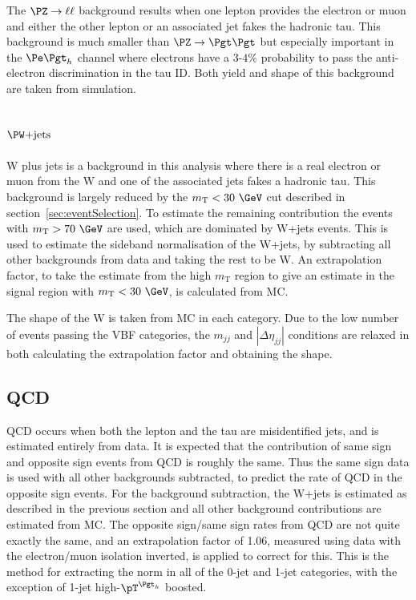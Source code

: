 The $\PZ\to\ell\ell$ background results when one lepton provides the electron or
muon and either the other lepton or an associated jet fakes the hadronic tau. This
background is much smaller than $\ZToTauTau$ but especially important in the
$\etau$ channel where electrons have a $3$-$4\%$ probability to pass the
anti-electron discrimination in the tau ID. Both yield and shape of this
background are taken from simulation.

\subsection{$\WJets$}
\label{sec:backgroundEstimation_WplusJets}

W plus jets is a background in this analysis where there is a real electron or
muon from the W and one of the associated jets fakes a hadronic tau. This
background is largely reduced by the $m_{\text{T}}< 30~\GeV$ cut described in
section~\ref{sec:eventSelection}. To estimate the remaining contribution the
events with $m_{\text{T}}> 70~\GeV$ are used, which are dominated by W+jets 
events. This is used to estimate the sideband normalisation of the W+jets, by
subtracting all other backgrounds from data and taking the rest to be W.
An extrapolation factor, to take the estimate from the high $m_{\text{T}}$ region to
give an estimate in the signal region with $m_{\text{T}}< 30~\GeV$, is calculated from MC.

The shape of the W is taken from MC in each category. Due to the low number of
events passing the VBF categories, the $m_{jj}$ and $|\Delta\eta_{jj}|$
conditions are relaxed in both calculating the extrapolation factor and
obtaining the shape.

\subsection{QCD}
\label{sec:backgroundEstimation_QCD}

QCD occurs when both the lepton and the tau are misidentified jets, and is estimated 
entirely from data. It is expected that the contribution of
same sign and opposite sign events from QCD is roughly the same. Thus the same
sign data is used with all other backgrounds subtracted, to predict the rate of
QCD in the opposite sign events. For the background subtraction, the W+jets is
estimated as described in the previous section and all other background
contributions are estimated from MC. The opposite sign/same sign rates from QCD
are not quite exactly the same, and an extrapolation factor of 1.06, measured
using data with the electron/muon isolation inverted, is applied to correct for
this. This is the method for extracting the norm in all of the 0-jet and 1-jet
categories, with the exception of 1-jet high-$\pT^{\Pgth}$ boosted.

